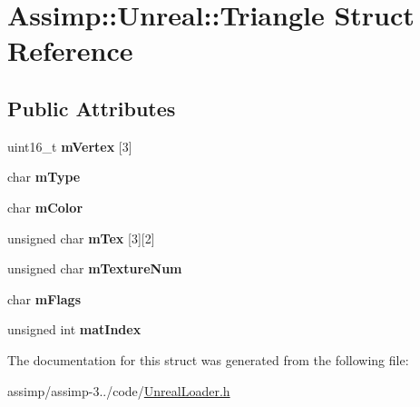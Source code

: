 \hypertarget{struct_assimp_1_1_unreal_1_1_triangle}{\section{Assimp\+:\+:Unreal\+:\+:Triangle Struct Reference}
\label{struct_assimp_1_1_unreal_1_1_triangle}
}
\subsection*{Public Attributes}
\begin{DoxyCompactItemize}
\item 
\hypertarget{struct_assimp_1_1_unreal_1_1_triangle_a0920cd498baac7be31a126212236e557}{uint16\+\_\+t {\bfseries m\+Vertex} \mbox{[}3\mbox{]}}\label{struct_assimp_1_1_unreal_1_1_triangle_a0920cd498baac7be31a126212236e557}

\item 
\hypertarget{struct_assimp_1_1_unreal_1_1_triangle_a88f5f826d564045ce3351551ec2aa14d}{char {\bfseries m\+Type}}\label{struct_assimp_1_1_unreal_1_1_triangle_a88f5f826d564045ce3351551ec2aa14d}

\item 
\hypertarget{struct_assimp_1_1_unreal_1_1_triangle_ac098a9d5e17c14a9931acb8f757ff48a}{char {\bfseries m\+Color}}\label{struct_assimp_1_1_unreal_1_1_triangle_ac098a9d5e17c14a9931acb8f757ff48a}

\item 
\hypertarget{struct_assimp_1_1_unreal_1_1_triangle_a8a7816ff7432399f76e2ba98eef9b6e4}{unsigned char {\bfseries m\+Tex} \mbox{[}3\mbox{]}\mbox{[}2\mbox{]}}\label{struct_assimp_1_1_unreal_1_1_triangle_a8a7816ff7432399f76e2ba98eef9b6e4}

\item 
\hypertarget{struct_assimp_1_1_unreal_1_1_triangle_acf2e94d0c35c286cee2fedacb9a02a67}{unsigned char {\bfseries m\+Texture\+Num}}\label{struct_assimp_1_1_unreal_1_1_triangle_acf2e94d0c35c286cee2fedacb9a02a67}

\item 
\hypertarget{struct_assimp_1_1_unreal_1_1_triangle_a07679121cd5e828f3c481f03aa20c3ec}{char {\bfseries m\+Flags}}\label{struct_assimp_1_1_unreal_1_1_triangle_a07679121cd5e828f3c481f03aa20c3ec}

\item 
\hypertarget{struct_assimp_1_1_unreal_1_1_triangle_aa3c0824aa28f294290d239820f6e7af0}{unsigned int {\bfseries mat\+Index}}\label{struct_assimp_1_1_unreal_1_1_triangle_aa3c0824aa28f294290d239820f6e7af0}

\end{DoxyCompactItemize}


The documentation for this struct was generated from the following file\+:\begin{DoxyCompactItemize}
\item 
assimp/assimp-\/3../code/\hyperlink{_unreal_loader_8h}{Unreal\+Loader.\+h}\end{DoxyCompactItemize}
